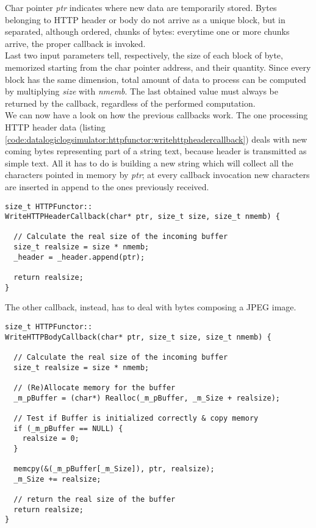 Char pointer \textit{ptr} indicates where new data are temporarily
stored. Bytes belonging to HTTP header or body do not arrive as a
unique block, but in separated, although ordered, chunks of bytes:
everytime one or more chunks arrive, the proper callback is invoked.
\\
Last two input parameters tell, respectively, the size of each
block of byte, memorized starting from the char pointer address,
and their quantity. Since every block has the same dimension,
total amount of data to process can be computed by multiplying
\textit{size} with \textit{nmemb}. The last obtained value must
always be returned by the callback, regardless of the performed
computation.
\\
We can now have a look on how the previous callbacks work. The one
processing HTTP header data (listing
\ref{code:datalogiclogsimulator:httpfunctor:writehttpheadercallback})
deals with new coming bytes representing part of a string text, because
header is transmitted as simple text. All it has
to do is building a new string which will collect all the characters
pointed in memory by \textit{ptr}; at every callback invocation new
characters are inserted in append to the ones previously received.
\\
\begin{lstlisting}[caption={\texttt{HTTPFunctor::WriteHTTPHeaderCallback} method},
    label={code:datalogiclogsimulator:httpfunctor:writehttpheadercallback}]
size_t HTTPFunctor::
WriteHTTPHeaderCallback(char* ptr, size_t size, size_t nmemb) {

  // Calculate the real size of the incoming buffer
  size_t realsize = size * nmemb;
  _header = _header.append(ptr);
 
  return realsize;
}
\end{lstlisting}

The other callback, instead, has to deal with bytes composing
a JPEG image.
\\
\begin{lstlisting}[caption={\texttt{HTTPFunctor::WriteHTTPBodyCallback} method},
    label={code:datalogiclogsimulator:httpfunctor:writehttpbodycallback}]
size_t HTTPFunctor::
WriteHTTPBodyCallback(char* ptr, size_t size, size_t nmemb) {

  // Calculate the real size of the incoming buffer
  size_t realsize = size * nmemb;
  
  // (Re)Allocate memory for the buffer
  _m_pBuffer = (char*) Realloc(_m_pBuffer, _m_Size + realsize);
  
  // Test if Buffer is initialized correctly & copy memory
  if (_m_pBuffer == NULL) {
    realsize = 0;
  }
  
  memcpy(&(_m_pBuffer[_m_Size]), ptr, realsize);
  _m_Size += realsize;
   
  // return the real size of the buffer
  return realsize;
}
\end{lstlisting}

